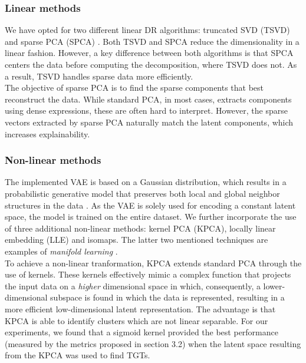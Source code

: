 \subsubsection{Linear methods}
We have opted for two different linear DR algorithms: truncated SVD (TSVD) and sparse PCA (SPCA) \cite{doi:10.1198/106186006X113430}. Both TSVD and SPCA reduce the dimensionality in a linear fashion. However, a key difference between both algorithms is that SPCA centers the data before computing the decomposition, where TSVD does not. As a result, TSVD handles sparse data more efficiently.\\

The objective of sparse PCA is to find the sparse components that best reconstruct the data. While standard PCA, in most cases, extracts components using dense expressions, these are often hard to interpret. However, the sparse vectors extracted by sparse PCA naturally match the latent components, which increases explainability.

\subsubsection{Non-linear methods}
The implemented VAE is based on a Gaussian distribution, which results in a probabilistic generative model that preserves both local and global neighbor structures in the data \cite{ding2018interpretable}. As the VAE is solely used for encoding a constant latent space, the model is trained on the entire dataset. We further incorporate the use of three additional non-linear methods: kernel PCA (KPCA), locally linear embedding (LLE) \cite{Roweis2323} and isomaps. The latter two mentioned techniques are examples of \textit{manifold learning} \cite{cayton2005algorithms}.\\

To achieve a non-linear tranformation, KPCA \cite{10.1007/BFb0020217} extends standard PCA through the use of kernels. These kernels effectively mimic a complex function that projects the input data on a \textit{higher} dimensional space in which, consequently, a lower-dimensional subspace is found in which the data is represented, resulting in a more efficient low-dimensional latent representation. The advantage is that KPCA is able to identify clusters which are not linear separable. For our experiments, we found that a sigmoid kernel provided the best performance (measured by the metrics proposed in section 3.2) when the latent space resulting from the KPCA was used to find TGTs.\\
    
